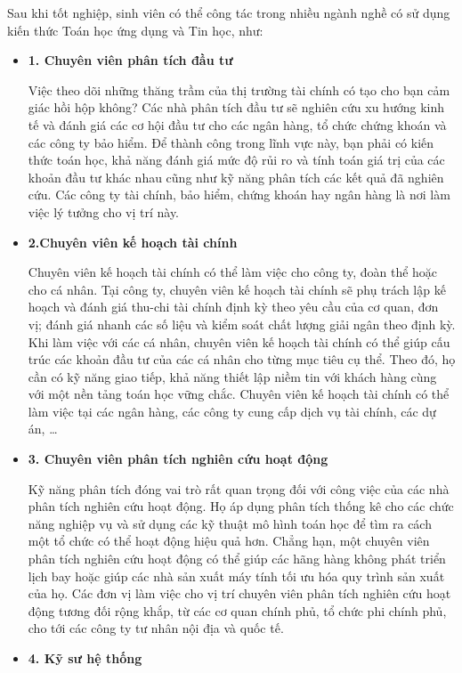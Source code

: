 \documentclass[12pt,a4paper]{report}
\begin{document}
    \newpage
        Sau khi tốt nghiệp, sinh viên có thể công tác trong nhiều ngành nghề có sử dụng kiến thức Toán học ứng dụng và Tin học, như:
      \begin{itemize}
       \item{\bf1. Chuyên viên phân tích đầu tư}
        
    Việc theo dõi những thăng trầm của thị trường tài chính có tạo cho bạn cảm giác hồi hộp không? Các nhà phân tích đầu tư sẽ nghiên cứu xu hướng kinh tế và đánh giá các cơ hội đầu tư cho các ngân hàng, tổ chức chứng khoán và các công ty bảo hiểm. Để thành công trong lĩnh vực này, bạn phải có kiến thức toán học, khả năng đánh giá mức độ rủi ro và tính toán giá trị của các khoản đầu tư khác nhau cũng như kỹ năng phân tích các kết quả đã nghiên cứu. Các công ty tài chính, bảo hiểm, chứng khoán hay ngân hàng là nơi làm việc lý tưởng cho vị trí này.
    
    \item{\bf{2.Chuyên viên kế hoạch tài chính }}
    
    Chuyên viên kế hoạch tài chính có thể làm việc cho công ty, đoàn thể hoặc cho cá nhân. Tại công ty, chuyên viên kế hoạch tài chính sẽ phụ trách lập kế hoạch và đánh giá thu-chi tài chính định kỳ theo yêu cầu của cơ quan, đơn vị; đánh giá nhanh các số liệu và kiểm soát chất lượng giải ngân theo định kỳ. Khi làm việc với các cá nhân, chuyên viên kế hoạch tài chính có thể giúp cấu trúc các khoản đầu tư của các cá nhân cho từng mục tiêu cụ thể. Theo đó, họ cần có kỹ năng giao tiếp, khả năng thiết lập niềm tin với khách hàng cùng với một nền tảng toán học vững chắc. Chuyên viên kế hoạch tài chính có thể làm việc tại các ngân hàng, các công ty cung cấp dịch vụ tài chính, các dự án, … 
    \item{\bf 3. Chuyên viên phân tích nghiên cứu hoạt động}
    
    Kỹ năng phân tích đóng vai trò rất quan trọng đối với công việc của các nhà phân tích nghiên cứu hoạt động. Họ áp dụng phân tích thống kê cho các chức năng nghiệp vụ và sử dụng các kỹ thuật mô hình toán học để tìm ra cách một tổ chức có thể hoạt động hiệu quả hơn. Chẳng hạn, một chuyên viên phân tích nghiên cứu hoạt động có thể giúp các hãng hàng không phát triển lịch bay hoặc giúp các nhà sản xuất máy tính tối ưu hóa quy trình sản xuất của họ. Các đơn vị làm việc cho vị trí chuyên viên phân tích nghiên cứu hoạt động tương đối rộng khắp, từ các cơ quan chính phủ, tổ chức phi chính phủ, cho tới các công ty tư nhân nội địa và quốc tế. 
    \item{\bf4. Kỹ sư hệ thống}
    

\end{itemize}
\end{document}
